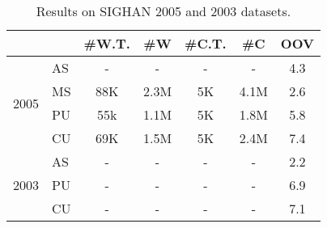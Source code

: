 \begin{table}
\centering
\begin{small}
\begin{tabular}{ l | l | c | c | c | c | c   }
\hline
    \multicolumn{2}{c}{}  &  \multicolumn{1}{c}{\#W.T.} &  \multicolumn{1}{c}{\#W} &  \multicolumn{1}{c}{\#C.T.}    & \multicolumn{1}{c}{\#C}   &  \multicolumn{1}{c}{OOV}  \\ 
\hline
\multirow{4}{*}{2005}  & AS      & -  &  -  & -  &  - & 4.3   \\
& MS      & 88K & 2.3M & 5K & 4.1M & 2.6 \\
& PU      &  55k & 1.1M & 5K & 1.8M & 5.8  \\
& CU      & 69K  & 1.5M& 5K & 2.4M & 7.4 \\
\hline
\multirow{3}{*}{2003} & AS  &  - & - & - & - & 2.2 \\
& PU  &  - & - & - & - & 6.9 \\
& CU  & - & - & - & - & 7.1  \\

\end{tabular} 
\caption{Results on SIGHAN 2005 and 2003 datasets. }\label{tbl:results}
\end{small}
\end{table}